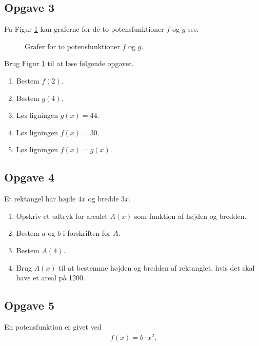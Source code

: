 \subsection*{Opgave 3}
På Figur \ref{fig:opgavegrafer} kan graferne for de to potensfunktioner $f$ og $g$ ses. 
\begin{figure}[H]
	\center
	\caption{Grafer for to potensfunktioner $f$ og $g$.}
	\label{fig:opgavegrafer}
\end{figure}
Brug Figur \ref{fig:opgavegrafer} til at løse følgende opgaver.
\begin{enumerate}[label=\roman*)]
	\item Bestem $f(2)$.
	\item Bestem $g(4)$.
	\item Løs ligningen $g(x) = 44$.
	\item Løs ligningen $f(x) = 30$.
	\item Løs ligningen $f(x) = g(x)$.
\end{enumerate}

\subsection*{Opgave 4}
Et rektangel har højde $4x$ og bredde $3x$. 
\begin{enumerate}[label=\roman*)]
	\item Opskriv et udtryk for arealet $A(x)$ som funktion af højden og bredden. 
	\item Bestem $a$ og $b$ i forskriften for $A$. 
	\item Bestem $A(4)$.
	\item Brug $A(x)$ til at bestemme højden og bredden af rektanglet, hvis det skal have et areal på 1200.
\end{enumerate}

\subsection*{Opgave 5}
En potensfunktion er givet ved 
\begin{align*}
	f(x) = b\cdot x^2.
\end{align*}

